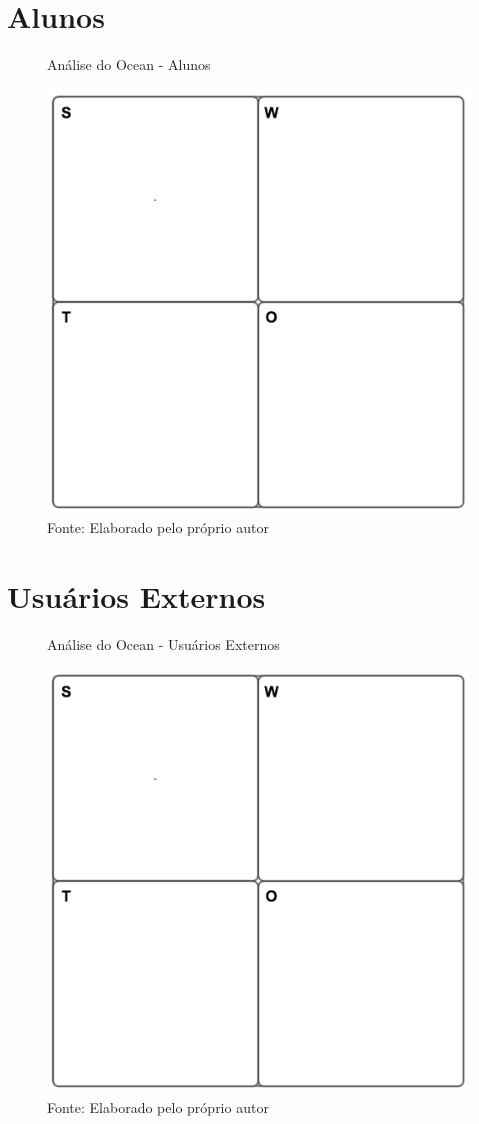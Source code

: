 \section{Alunos}

\begin{figure}[H]
\caption{Análise do Ocean - Alunos}
\centerline{\includegraphics[scale=0.5]{img/generalswot}}
\label{fig:swotalunos}
\caption* {Fonte: Elaborado pelo próprio autor}
\end{figure}

\section{Usuários Externos}

\begin{figure}[h]
\caption{Análise do Ocean - Usuários Externos}
\centerline{\includegraphics[scale=0.5]{img/generalswot}}
\label{fig:swotusuarios}
\caption* {Fonte: Elaborado pelo próprio autor}
\end{figure}